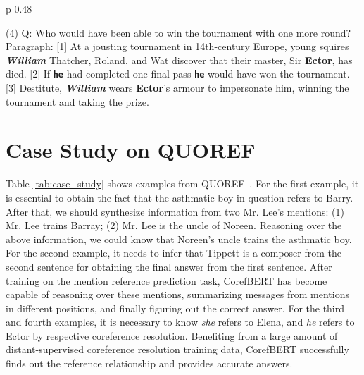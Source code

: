 \documentclass[11pt,a4paper]{article}
\newcommand\BASESIZE{\xspace}
\begin{document}
\begin{table}[!t]
\begin{center}
\begin{tabular}{p {0.48\textwidth}}
\midrule

(4) Q: Who would have been able to win the tournament with one more round? \\    
Paragraph: {\color{olive} [1]} At a jousting tournament in 14th-century Europe, young squires {\color{blue}\bf \textit{William}} Thatcher, Roland, and Wat discover that their master, Sir {\color{red} \bf Ector}, has died. {\color{olive} [2]} If {\color{rel} \bf \texttt{he}} had completed one final pass {\color{rel} \bf \texttt{he}} would have won the tournament. {\color{olive} [3]} Destitute, {\color{blue}\bf \textit{William}} wears {\color{red} \bf Ector}'s armour to impersonate him, winning the tournament and taking the prize.  \\


    \bottomrule
    \end{tabular}
    \end{center}
    \caption{ Examples from QUOREEF~\citep{QUOREF} that were correctly predicted by CorefBERT\BASESIZE, but wrongly predicted by BERT\BASESIZE. {\color{blue}\bf \textit{Answers from BERT\BASESIZE}}, {\color{red} \bf Answers from CorefBERT\BASESIZE}, and {\color{rel} \bf \texttt{Clue}} are colored respectively. }

    \label{tab:case_study}
\end{table}
\section{Case Study on QUOREF}

Table \ref{tab:case_study} shows examples from QUOREF~\citep{QUOREF}. For the first example, it is essential to obtain the fact that the asthmatic boy in question refers to Barry. After that, we should synthesize information from two Mr. Lee's mentions: (1) Mr. Lee trains Barray; (2) Mr. Lee is the uncle of Noreen. Reasoning over the above information,  we could know that Noreen's uncle trains the asthmatic boy. For the second example, it needs to infer that Tippett is a composer from the second sentence for obtaining the final answer from  the first sentence. After training on the mention reference prediction task, CorefBERT has become capable of reasoning over these mentions, summarizing messages from mentions in different positions, and finally figuring out the correct answer.
For the third and fourth examples, it is necessary to know \emph{she} refers to Elena, and \emph{he} refers to Ector by respective coreference resolution. Benefiting from a large amount of distant-supervised coreference resolution training data, CorefBERT successfully finds out the reference relationship and provides accurate answers.
\end{document}
